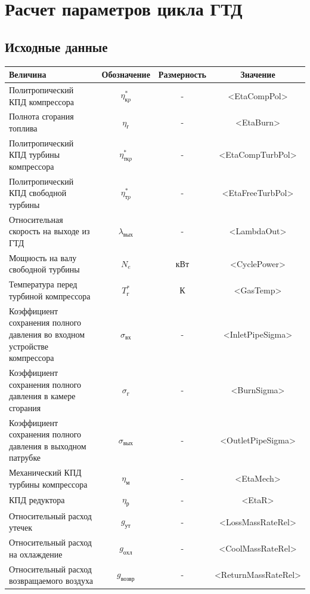 \documentclass[a4paper,10pt]{article}
\begin{document}
\tableofcontents
\newpage

\section{Расчет параметров цикла ГТД}

\subsection{Исходные данные}
\begin{center}
	\begin{tabular}{|p{7cm}|c|c|c|}
		\hline
		\textbf{Величина} & \textbf{Обозначение} & \textbf{Размерность} & \textbf{Значение} \\ \hline
		Политропический КПД компрессора & $\eta_{кp}^*$ & - & <EtaCompPol> \\ \hline
		Полнота сгорания топлива & $\eta_г$ & - & <EtaBurn> \\ \hline
		Политропический КПД турбины компрессора & $\eta_{ткp}^*$ & - & <EtaCompTurbPol> \\ \hline
		Политропический КПД свободной турбины & $\eta_{тp}^*$ & - & <EtaFreeTurbPol> \\ \hline
		Относительная скорость на выходе из ГТД & $\lambda_{вых}$ & - & <LambdaOut> \\ \hline
		Мощность на валу свободной турбины & $N_e$ & кВт & <CyclePower> \\ \hline
		Температура перед турбиной компрессора & $T_г^*$ & К & <GasTemp> \\ \hline
		Коэффициент сохранения полного давления во входном устройстве компрессора & $\sigma_{вх}$ & - & <InletPipeSigma> \\ \hline
		Коэффициент сохранения полного давления в камере сгорания & $\sigma_{г}$ & - & <BurnSigma> \\ \hline
		Коэффициент сохранения полного давления в выходном патрубке & $\sigma_{вых}$ & - & <OutletPipeSigma> \\ \hline
		Механический КПД турбины компрессора & $\eta_м$ & - & <EtaMech> \\ \hline
		КПД редуктора & $\eta_р$ &  - & <EtaR> \\ \hline
		Относительный расход утечек & $g_{ут}$ &  - &<LossMassRateRel> \\ \hline
		Относительный расход на охлаждение & $g_{охл}$ &  - & <CoolMassRateRel> \\ \hline
		Относительный расход возвращаемого воздуха & $g_{возвр}$ & - & <ReturnMassRateRel> \\ \hline
	\end{tabular}
\end{center}
\end{document}
